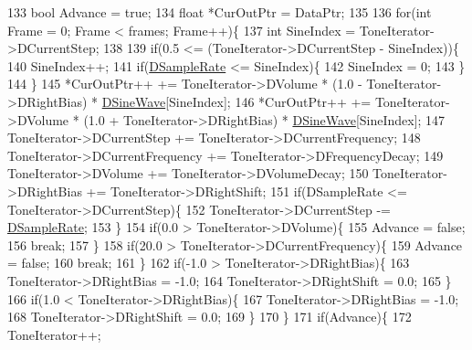 \begin{DoxyCode}
133         \textcolor{keywordtype}{bool} Advance = \textcolor{keyword}{true};
134         \textcolor{keywordtype}{float} *CurOutPtr = DataPtr;
135         
136         \textcolor{keywordflow}{for}(\textcolor{keywordtype}{int} Frame = 0; Frame < frames; Frame++)\{
137             \textcolor{keywordtype}{int} SineIndex = ToneIterator->DCurrentStep;
138             
139             \textcolor{keywordflow}{if}(0.5 <= (ToneIterator->DCurrentStep - SineIndex))\{
140                 SineIndex++;
141                 \textcolor{keywordflow}{if}(\hyperlink{classCSoundLibraryMixer_af2d94eb0c2b55d92ff00d18a25cbed6a}{DSampleRate} <= SineIndex)\{
142                     SineIndex = 0;   
143                 \}
144             \}
145             *CurOutPtr++ += ToneIterator->DVolume * (1.0 - ToneIterator->DRightBias) * 
      \hyperlink{classCSoundLibraryMixer_a7d696c93362c862bfc651a28ee8f67cf}{DSineWave}[SineIndex];
146             *CurOutPtr++ += ToneIterator->DVolume * (1.0 + ToneIterator->DRightBias) * 
      \hyperlink{classCSoundLibraryMixer_a7d696c93362c862bfc651a28ee8f67cf}{DSineWave}[SineIndex];
147             ToneIterator->DCurrentStep += ToneIterator->DCurrentFrequency;
148             ToneIterator->DCurrentFrequency += ToneIterator->DFrequencyDecay;
149             ToneIterator->DVolume += ToneIterator->DVolumeDecay;
150             ToneIterator->DRightBias += ToneIterator->DRightShift;
151             \textcolor{keywordflow}{if}(DSampleRate <= ToneIterator->DCurrentStep)\{
152                 ToneIterator->DCurrentStep -= \hyperlink{classCSoundLibraryMixer_af2d94eb0c2b55d92ff00d18a25cbed6a}{DSampleRate};
153             \}
154             \textcolor{keywordflow}{if}(0.0 > ToneIterator->DVolume)\{
155                 Advance = \textcolor{keyword}{false};
156                 \textcolor{keywordflow}{break};
157             \}
158             \textcolor{keywordflow}{if}(20.0 > ToneIterator->DCurrentFrequency)\{
159                 Advance = \textcolor{keyword}{false};
160                 \textcolor{keywordflow}{break};
161             \}
162             \textcolor{keywordflow}{if}(-1.0 > ToneIterator->DRightBias)\{
163                 ToneIterator->DRightBias = -1.0;
164                 ToneIterator->DRightShift = 0.0;
165             \}
166             \textcolor{keywordflow}{if}(1.0 < ToneIterator->DRightBias)\{
167                 ToneIterator->DRightBias = -1.0;
168                 ToneIterator->DRightShift = 0.0;                
169             \}
170         \}        
171         \textcolor{keywordflow}{if}(Advance)\{
172             ToneIterator++;    

\end{DoxyCode}
